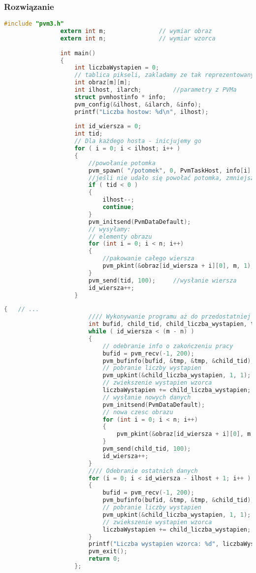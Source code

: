 			\subsubsection{Rozwiązanie}
				\begin{lstlisting}[language=C]
				#include "pvm3.h"
				extern int m;				// wymiar obraz
				extern int n;				// wymiar wzorca
				
				int main()
				{
					int liczbaWystapien = 0;
					// tablica pikseli, zakladamy ze tak reprezentowany jest obraz
					int obraz[m][m];		
					int ilhost, ilarch;			//parametry z PVMa
					struct pvmhostinfo * info;
					pvm_config(&ilhost, &ilarch, &info);
					printf("Liczba hostow: %d\n", ilhost);
					
					int id_wiersza = 0;
					int tid;
					// Dla każdego hosta - inicjujemy go
					for ( i = 0; i < ilhost; i++ )
					{
						//powołanie potomka
						pvm_spawn( "/potomek", 0, PvmTaskHost, info[i].hi_name, 1, &tid);
						//jeśli nie udało się powołać potomka, zmniejszamy liczbę hostów i kontynuujemy	
						if ( tid < 0 )
						{
							ilhost--;	
							continue;
						}
						pvm_initsend(PvmDataDefault);
						// wysyłamy:
						// elementy obrazu
						for (int i = 0; i < n; i++)
						{
							//pakowanie całego wiersza
							pvm_pkint(&obraz[id_wiersza + i][0], m, 1);
						}
						pvm_send(tid, 100);		//wysłanie wiersza
						id_wiersza++;
					}
					\end{lstlisting}
					\newpage
					\begin{lstlisting}[language=C]
					{ 	// ...
						//// Wykonywanie programu aż do przedostatniej pętli
						int bufid, child_tid, child_liczba_wystapien, tmp;
						while ( id_wiersza < (m - n) )
						{
							// odebranie info o zakończeniu pracy
							bufid = pvm_recv(-1, 200);
							pvm_bufinfo(bufid, &tmp, &tmp, &child_tid);
							// pobranie liczby wystapien
							pvm_upkint(&child_liczba_wystapien, 1, 1);
							// zwiekszenie wystapien wzorca
							liczbaWystapien += child_liczba_wystapien;
							// wysłanie nowych danych
							pvm_initsend(PvmDataDefault);
							// nowa czesc obrazu
							for (int i = 0; i < n; i++)
							{
								pvm_pkint(&obraz[id_wiersza + i][0], m, 1);
							}
							pvm_send(child_tid, 100);
							id_wiersza++;
						}
						//// Odebranie ostatnich danych
						for	(i = 0; i < id_wiersza - ilhost + 1; i++ )
						{
							bufid = pvm_recv(-1, 200);
							pvm_bufinfo(bufid, &tmp, &tmp, &child_tid);
							// pobranie liczby wystapien
							pvm_upkint(&child_liczba_wystapien, 1, 1);
							// zwiekszenie wystapien wzorca
							liczbaWystapien += child_liczba_wystapien;
						}
						printf("Liczba wystapien wzorca: %d", liczbaWystapien);
						pvm_exit();
						return 0;
					};
				\end{lstlisting}
		\newpage
